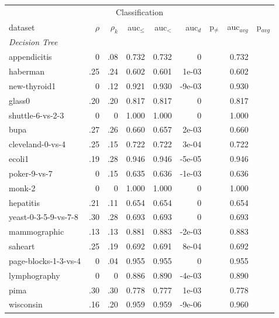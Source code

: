 \begin{tabular}{l@{\hspace{3pt}}r@{\hspace{3pt}}r@{\hspace{3pt}}r@{\hspace{3pt}}r@{\hspace{3pt}}r@{\hspace{3pt}}c@{\hspace{3pt}}r@{\hspace{3pt}}c}
\toprule
\multicolumn{9}{c}{Classification} \\
dataset & $\rho$ & $\rho_{k}$ & auc$_{\leq}$ & auc$_{<}$ & auc$_{d}$ & p$_{\neq}$ & auc$_{avg}$ & p$_{avg}$ \\
\midrule
\multicolumn{9}{l}{\emph{Decision Tree}} \\
appendicitis & 0 & .08 & 0.732 & 0.732 & 0 &  & 0.732 &  \\
haberman & .25 & .24 & 0.602 & 0.601 &  1e-03 &  & 0.602 &  \\
new-thyroid1 & 0 & .12 & 0.921 & 0.930 & -9e-03 &  & 0.930 &  \\
glass0 & .20 & .20 & 0.817 & 0.817 & 0 &  & 0.817 &  \\
shuttle-6-vs-2-3 & 0 & 0 & 1.000 & 1.000 & 0 &  & 1.000 &  \\
bupa & .27 & .26 & 0.660 & 0.657 &  2e-03 &  & 0.660 &  \\
cleveland-0-vs-4 & .25 & .15 & 0.722 & 0.722 &  3e-04 &  & 0.722 &  \\
ecoli1 & .19 & .28 & 0.946 & 0.946 & -5e-05 &  & 0.946 &  \\
poker-9-vs-7 & 0 & .15 & 0.635 & 0.636 & -1e-03 &  & 0.636 &  \\
monk-2 & 0 & 0 & 1.000 & 1.000 & 0 &  & 1.000 &  \\
hepatitis & .21 & .11 & 0.654 & 0.654 & 0 &  & 0.654 &  \\
yeast-0-3-5-9-vs-7-8 & .30 & .28 & 0.693 & 0.693 & 0 &  & 0.693 &  \\
mammographic & .13 & .13 & 0.881 & 0.883 & -2e-03 &  & 0.883 &  \\
saheart & .25 & .19 & 0.692 & 0.691 &  8e-04 &  & 0.692 &  \\
page-blocks-1-3-vs-4 & 0 & .04 & 0.955 & 0.955 & 0 &  & 0.955 &  \\
lymphography & 0 & 0 & 0.886 & 0.890 & -4e-03 &  & 0.890 &  \\
pima & .30 & .30 & 0.778 & 0.777 &  1e-03 &  & 0.778 &  \\
wisconsin & .16 & .20 & 0.959 & 0.959 & -9e-06 &  & 0.960 &  \\

\end{tabular}
